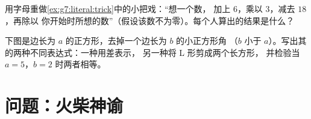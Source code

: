 \begin{exercise}[$\star\star$]\label{exo:g7:literal:10}
用字母重做\cref{ex:g7:literal:trick}中的小把戏：“想一个数，
加上 $6$，乘以 $3$，减去 $18$，再除以
你开始时所想的数”（假设该数不为零）。每个人算出的结果是什么？
\end{exercise}

\begin{exercise}[$\star\star\star$]\label{exo:g7:literal:11}
下图是边长为 $a$ 的正方形，去掉一个边长为 $b$ 的小正方形角
（$b$ 小于 $a$）。写出其的两种不同表达式：一种用差表示，
另一种将 L 形剪成两个长方形，
并检验当 $a = 5$，$b = 2$ 时两者相等。
\end{exercise}

\section{问题：火柴神谕}

